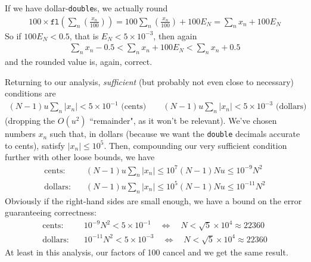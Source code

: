 \documentclass[11pt, oneside]{amsart}   	%
\begin{document}
If we have dollar-\texttt{double}s, we actually round 
\begin{align*}
    100 \times \texttt{fl}\left(\sum_n \left( \frac{x_n}{100} \right)\right)
        = 100 \sum_n \left( \frac{x_n}{100} \right) + 100 E_N
        = \sum_n x_n + 100 E_N
\end{align*}
So if $100 E_N < 0.5$, that is $E_N < 5 \times 10^{-3}$, then again 
\begin{align*}
    \sum_n x_n - 0.5 < \sum_n x_n + 100E_N < \sum_n x_n + 0.5
\end{align*}
and the rounded value is, again, correct. 

Returning to our analysis, {\em sufficient} (but probably not even close to necessary) conditions are
\begin{align*}
    (N-1)u \sum_n | x_n | < 5\times 10^{-1} \text{ (cents)}
    \quad\quad
    (N-1)u \sum_n | x_n | < 5\times 10^{-3} \text{ (dollars)}
\end{align*}
(dropping the $O(u^2)$ ``remainder", as it won't be relevant). We've chosen numbers $x_n$ such that, in dollars (because we want the \texttt{double} decimals accurate to cents), satisfy $|x_n| \leq 10^5$. Then, compounding our very sufficient condition further with other loose bounds, we have 
\begin{align*}
    \text{cents: }\quad
        &(N-1)u \sum_n | x_n | 
        \leq 10^7 (N-1)N u 
        \leq 10^{-9} N^2
         \\
    \text{dollars:}\quad
        &(N-1)u \sum_n | x_n | 
        \leq 10^5 (N-1)N u 
        \leq 10^{-11} N^2
\end{align*}
Obviously if the right-hand sides are small enough, we have a bound on the error guaranteeing correctness: 
\begin{align*}
    \text{cents: }\quad
        &10^{-9} N^2 < 5\times10^{-1}
        \quad\iff\quad
        N < \sqrt{5}\times10^{4} \approx 22360
         \\
    \text{dollars:}\quad
        &10^{-11} N^2 < 5\times10^{-3}
        \quad\iff\quad
        N < \sqrt{5}\times10^{4} \approx 22360
\end{align*}
At least in this analysis, our factors of 100 cancel and we get the same result. 
\end{document}
